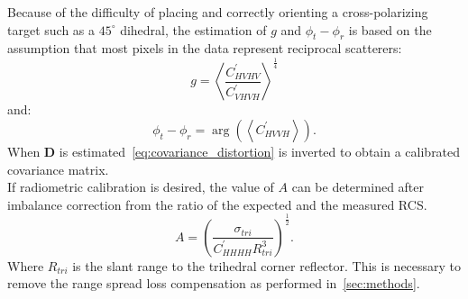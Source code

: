 Because of the difficulty of placing and correctly orienting a cross-polarizing target such as a $45^\circ$ dihedral, the estimation of $g$ and $\phi_t - \phi_r$ is based on the assumption that most pixels in the data represent reciprocal scatterers:
\begin{equation}
	g = \left<\frac{C_{HVHV}^{\prime}}{C_{VHVH}^{\prime}}\right>^\frac{1}{4}
\end{equation}
and:
\begin{equation}
	\phi_t - \phi_r =\operatorname{arg}\left( \left<C_{HVVH}^{\prime}\right>\right).
\end{equation}
When $\mathbf{D}$ is estimated~\eqref{eq:covariance_distortion} is inverted to obtain a calibrated covariance matrix.\\
If radiometric calibration is desired, the value of $A$ can be determined after imbalance correction from the ratio of the expected and the measured RCS.
\begin{equation}
	A =	\left(\frac{\sigma_{tri}}{C^{\prime}_{HHHH} R_{tri}^{3}}\right)^\frac{1}{2}.
\end{equation}
Where $R_{tri}$ is the slant range to the trihedral corner reflector. This is necessary to remove the range spread loss compensation as performed in~\autoref{sec:methods}.
